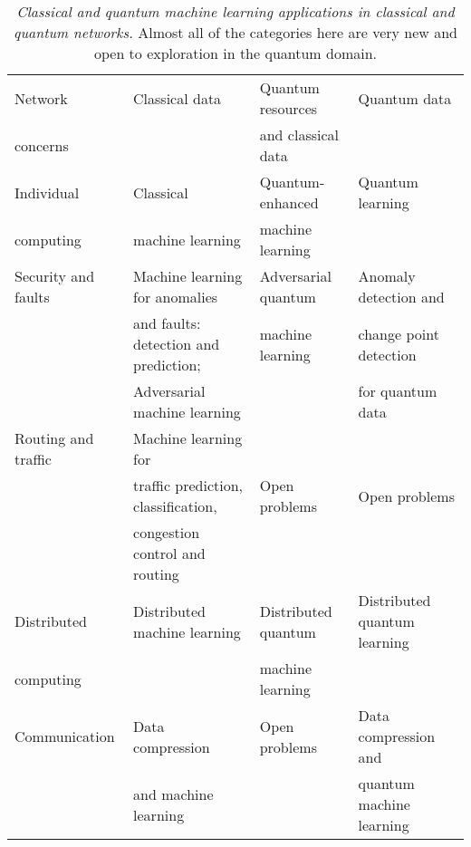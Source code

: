 \documentclass[twocolumn, aps, rmp, amsmath, amssymb, nofootinbib, superscriptaddress, longbibliography, floatfix, table-of-contents, eqsecnum]{revtex4-2}
\begin{document}
\begin{table}[h]
\centering
\begin{adjustbox}{width=\textwidth}
\begin{tabular}{lllp{5cm}}
Network  & Classical data & Quantum resources  & Quantum data \\
concerns & & and classical data & \\\hhline{|=|=|=|=|}
Individual & Classical   & Quantum-enhanced  & Quantum learning  \\ 
computing & machine learning & machine learning \\ \hline 
Security and faults & Machine learning for anomalies  & Adversarial quantum & Anomaly detection and  \\
& and faults: detection and prediction; & machine learning  & change point detection \\
& Adversarial machine learning &  & for quantum data \\ \hline 
Routing and traffic & Machine learning for \\
& traffic prediction, classification, & Open problems  & Open problems \\
& congestion control and routing\\ \hline 
Distributed  & Distributed machine learning & Distributed quantum & Distributed quantum learning \\
computing & & machine learning\\ \hline 
 Communication & Data compression & Open problems & Data compression and \\
 & and machine learning & & quantum machine learning \\ \hline 
\end{tabular}
\end{adjustbox}
\caption{\label{tab:CommTable2} \textit{Classical and quantum machine learning applications in classical and quantum networks.} Almost all of the categories here are very new and open to exploration in the quantum domain.}
\end{table}


\end{document}
